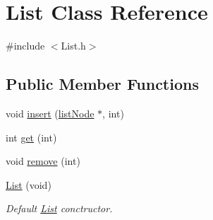 \hypertarget{class_list}{\section{List Class Reference}
\label{class_list}
}


{\ttfamily \#include $<$List.\-h$>$}

\subsection*{Public Member Functions}
\begin{DoxyCompactItemize}
\item 
void \hyperlink{class_list_ab18020056503ae320a7c09e51f568a2e}{insert} (\hyperlink{classlist_node}{list\-Node} $\ast$, int)
\item 
int \hyperlink{class_list_a928315839bc2b78ea20ffc96a5dd333c}{get} (int)
\item 
void \hyperlink{class_list_ab4a03210be80e7cfeab43217251575b8}{remove} (int)
\item 
\hypertarget{class_list_a30ca8f76a69a1af031025aedcbae29d0}{\hyperlink{class_list_a30ca8f76a69a1af031025aedcbae29d0}{List} (void)}\label{class_list_a30ca8f76a69a1af031025aedcbae29d0}

\begin{DoxyCompactList}\small\item\em Default \hyperlink{class_list}{List} conctructor. \end{DoxyCompactList}\end{DoxyCompactItemize}
